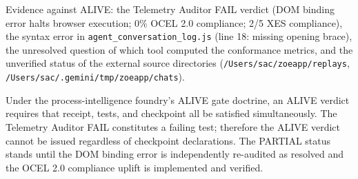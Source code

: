 Evidence against ALIVE: the Telemetry Auditor FAIL verdict (DOM binding error halts
browser execution; 0\% OCEL 2.0 compliance; 2/5 XES compliance), the syntax error
in \texttt{agent\_conversation\_log.js} (line 18: missing opening brace), the
unresolved question of which tool computed the conformance metrics, and the
unverified status of the external source directories (\texttt{/Users/sac/zoeapp/replays},
\texttt{/Users/sac/.gemini/tmp/zoeapp/chats}).

Under the process-intelligence foundry's ALIVE gate doctrine, an ALIVE verdict
requires that receipt, tests, and checkpoint all be satisfied simultaneously.
The Telemetry Auditor FAIL constitutes a failing test; therefore the ALIVE verdict
cannot be issued regardless of checkpoint declarations. The PARTIAL status stands
until the DOM binding error is independently re-audited as resolved and the OCEL 2.0
compliance uplift is implemented and verified.
